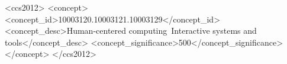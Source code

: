 \newcommand{\pGoalCenteredFlow}{\hypertarget{prx}{\principle{p1. Goal-Centered Flow}}}
\newcommand{\pAwareness}{\hypertarget{prx}{\principle{p2. Awareness}}}
\newcommand{\pMediation}{\hypertarget{prx}{\principle{p3. Mediation, not Arbitration.}}}


\newcommand{\ch}{\hypertarget{chx}{\challenge{cx. }}}
\newcommand{\tk}{\hypertarget{tskx}{\task{tx. }}}


\usepackage{siunitx}
\newcommand\percentage[2][round-precision=0]{
    \SI[round-mode = places, scientific-notation = fixed, fixed-exponent = 0, output-decimal-marker={.}, #1]{#2e2}{\percent}%
}

\newlength\MAX
\newcommand*{\PercBar}[2]{%
    \setlength\MAX{#2}%
    \percentage{#1}~\raisebox{-0.3ex}{\rlap{\textcolor{color1_brighter}{\rule{\MAX}{2ex}}}\color{color1}\rule{#1\MAX}{2ex}}%
}

\renewenvironment{quote} {
  \noindent
  \topsep=0pt
  \parskip=0pt
  \interlinepenalty=10000
  \leftskip=0pt 
  \rightskip=0pt 
  \parfillskip=0pt 
  \RaggedRight
  \itshape
  \list{}{
    \leftmargin 1em
    \rightmargin 1em
  }
  \item
  \relax
  }
{\endlist}

\usepackage{tcolorbox}
\usepackage{enumitem}


\begin{CCSXML}
    <ccs2012>
    <concept>
    <concept_id>10003120.10003121.10003129</concept_id>
    <concept_desc>Human-centered computing~Interactive systems and tools</concept_desc>
    <concept_significance>500</concept_significance>
    </concept>
    </ccs2012>
\end{CCSXML}


\usepackage{pgfplots}
